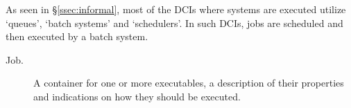 \documentclass{sig-alternate}
\begin{document}
\begin{description}

\end{description}

As seen in \S\ref{ssec:informal}, most of the DCIs where \pilotjobs systems
are executed utilize `queues', `batch systems' and `schedulers'. In such DCIs,
jobs are scheduled and then executed by a batch system.

\begin{description}

\item[Job.] A container for one or more executables, a description of their
properties and indications on how they should be executed.  

\end{description}
\end{document}
